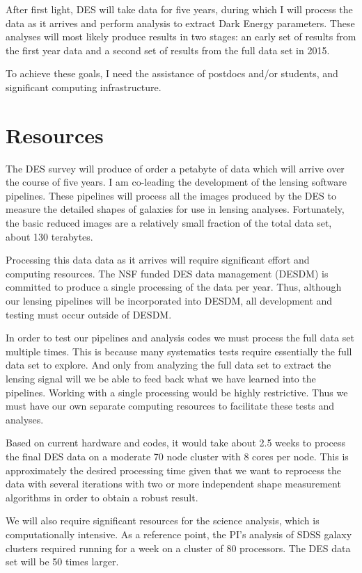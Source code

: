 \documentclass[12pt]{article}
\begin{document}
After first light, DES will take data for five years, during which I will
process the data as it arrives and perform analysis to extract Dark Energy
parameters.  These analyses will most likely produce results in two stages: an
early set of results from the first year data and a second set of results from
the full data set in 2015.  

To achieve these goals, I need the assistance of postdocs and/or students, and
significant computing infrastructure.

\section{Resources}

The DES survey will produce of order a petabyte of data which will arrive over
the course of five years.  I am co-leading the development of the lensing
software pipelines.  These pipelines will process all the images produced by
the DES to measure the detailed shapes of galaxies for use in lensing analyses.
Fortunately, the basic reduced images are a relatively small fraction of the
total data set, about 130 terabytes.

Processing this data data as it arrives will require significant effort and
computing resources.  The NSF funded DES data management (DESDM) is committed
to produce a single processing of the data per year.  Thus, although our
lensing pipelines will be incorporated into DESDM, all development and testing
must occur outside of DESDM.  

In order to test our pipelines and analysis codes we must process the full data
set multiple times.  This is because many systematics tests require essentially
the full data set to explore.  And only from analyzing the full data set to
extract the lensing signal will we be able to feed back what we have learned
into the pipelines.  Working with a single processing would be highly
restrictive.  Thus we must have our own separate computing resources to
facilitate these tests and analyses.  

Based on current hardware and codes, it would take about 2.5 weeks to process
the final DES data on a moderate 70 node cluster with 8 cores per node.  This
is approximately the desired processing time given that we want to reprocess
the data with several iterations with two or more independent shape measurement
algorithms in order to obtain a robust result.


We will also require significant resources for the science analysis, which is
computationally intensive.  As a reference point, the PI's analysis of SDSS
galaxy clusters required running for a week on a cluster of 80 processors.
The DES data set will be 50 times larger.
\end{document}
